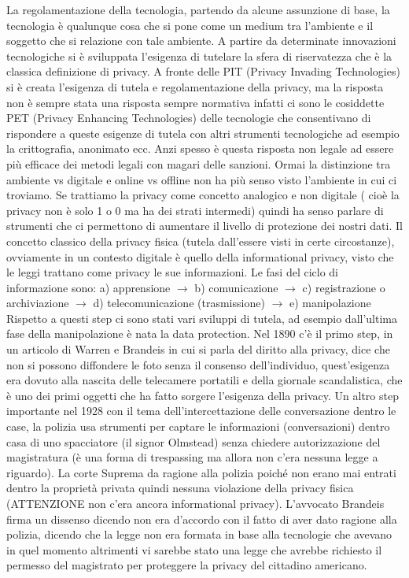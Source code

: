 \documentclass[a4page, 11pt, twocolumn]{article}
\begin{document}
La regolamentazione della tecnologia, partendo da alcune assunzione di base, la tecnologia è qualunque cosa che si pone come un medium tra l’ambiente e il soggetto che si relazione con tale ambiente. A partire da determinate innovazioni tecnologiche si è sviluppata l’esigenza di tutelare la sfera di riservatezza che è la classica definizione di privacy. A fronte delle PIT (Privacy Invading Technologies) si è creata l’esigenza di tutela e regolamentazione della privacy, ma la risposta non è sempre stata una risposta sempre normativa infatti ci sono le cosiddette PET (Privacy Enhancing Technologies) delle tecnologie che consentivano di rispondere a queste esigenze di tutela con altri strumenti tecnologiche ad esempio la crittografia, anonimato ecc. Anzi spesso è questa risposta non legale ad essere più efficace dei metodi legali con magari delle sanzioni. Ormai la distinzione tra ambiente vs digitale e online vs offline non ha più senso visto l’ambiente in cui ci troviamo. \newline
Se trattiamo la privacy come concetto analogico e non digitale ( cioè la privacy non è solo 1 o 0 ma ha dei strati intermedi) quindi ha senso parlare di strumenti che ci permettono di aumentare il livello di protezione dei nostri dati. Il concetto classico della privacy fisica (tutela dall’essere visti in certe circostanze), ovviamente in un contesto digitale è quello della informational privacy, visto che le leggi trattano come privacy le sue informazioni. \newline
Le fasi del ciclo di informazione sono: 
a) apprensione $\rightarrow$ b) comunicazione $\rightarrow$ c) registrazione o archiviazione $\rightarrow$ d) telecomunicazione (trasmissione) $\rightarrow$ e) manipolazione \newline
Rispetto a questi step ci sono stati vari sviluppi di tutela, ad esempio dall’ultima fase della manipolazione è nata la data protection. Nel 1890 c'è il primo step, in un articolo di Warren e Brandeis in cui si parla del diritto alla privacy, dice che non si possono diffondere le foto senza il consenso dell’individuo, quest'esigenza era dovuto alla nascita delle telecamere portatili e della giornale scandalistica, che è uno dei primi oggetti che ha fatto sorgere l’esigenza della privacy.\newline
Un altro step importante nel 1928 con il tema dell’intercettazione delle conversazione dentro le case, la polizia usa strumenti per captare le informazioni (conversazioni) dentro casa di uno spacciatore (il signor Olmstead) senza chiedere autorizzazione del magistratura (è una forma di trespassing ma allora non c’era nessuna legge a riguardo). La corte Suprema da ragione alla polizia poiché non erano mai entrati dentro la proprietà privata quindi nessuna violazione della privacy fisica (ATTENZIONE non c’era ancora informational privacy). L’avvocato Brandeis firma un dissenso dicendo non era d’accordo con il fatto di aver dato ragione alla polizia, dicendo che la legge non era formata in base alla tecnologie che avevano in quel momento altrimenti vi sarebbe stato una legge che avrebbe richiesto il permesso del magistrato per proteggere la privacy del cittadino americano. \newline
\end{document}
